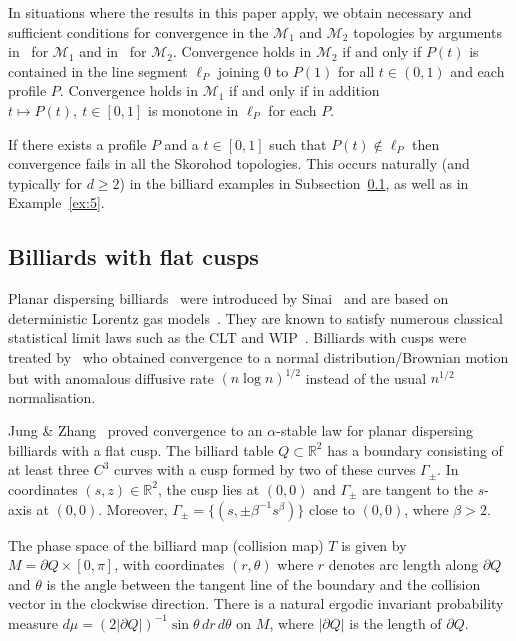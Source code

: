 \documentclass[12pt]{article}
\numberwithin{equation}{section}
\newcommand{\R}{{\mathbb R}}
\newcommand{\cM}{{\mathcal M}}
\begin{document}
\begin{rmk}
In situations where the results in this paper apply, we obtain necessary and sufficient conditions for convergence in the $\cM_1$ and $\cM_2$ topologies by arguments
in~\cite{MV20}
for $\cM_1$ and in~\cite{JMPVZ21} for $\cM_2$.
Convergence holds in $\cM_2$ if and only if 
$P(t)$ is contained in the line segment $\ell_P$  joining $0$ to $P(1)$ for all $t\in(0,1)$ and each profile $P$. 
Convergence holds in $\cM_1$ if and only if 
in addition $t\mapsto P(t),\ t\in[0,1]$ is monotone in $\ell_P$ for each $P$.

If there exists a profile $P$ and a $t\in[0,1]$ such that $P(t)\not\in \ell_P$ then convergence fails in all the Skorohod topologies. 
This occurs naturally (and typically for $d\ge2$) in the billiard examples in Subsection~\ref{sec:cusps}, as well as in Example~\ref{ex:5}.
\end{rmk}





\subsection{Billiards with flat cusps}
\label{sec:cusps}


Planar dispersing billiards~\cite{ChernovMarkarian} were introduced by Sinai~\cite{Sinai70} and are based on deterministic Lorentz gas models~\cite{Lorentz05}. They 
are known to satisfy numerous classical statistical limit laws 
such as the CLT  and WIP~\cite{BunimSinai81,BunimovichSinaiChernov91}. Billiards with cusps were treated by~\cite{BalintChernovDolgopyat11} who obtained convergence to a normal distribution/Brownian motion but with anomalous diffusive rate $(n\log n)^{1/2}$ instead of the usual $n^{1/2}$ normalisation.

Jung \& Zhang~\cite{JungZhang18} proved convergence to an $\alpha$-stable law for planar dispersing billiards with a flat cusp.
The billiard table $Q\subset\R^2$ has a boundary consisting of at least three $C^3$ curves
with a cusp formed by two of these curves $\Gamma_\pm$. In
coordinates $(s, z) \in\R^2$, the cusp lies at $(0, 0)$ and $\Gamma_\pm$ are tangent to the $s$-axis
at $(0, 0)$. Moreover, 
$\Gamma_\pm = \{(s, \pm\beta^{-1} s^\beta )\}$
close to $(0, 0)$, 
where $\beta > 2$. 

The phase space of the billiard map (collision map) $T$ is given by $M= \partial  Q \times[0, \pi ]$,
with coordinates $(r, \theta )$ where $r$ denotes arc length along $\partial  Q$ and $\theta$ is the angle between
the tangent line of the boundary and the collision vector in the clockwise direction. There
is a natural ergodic invariant probability measure $d\mu = (2|\partial Q|)^{-1} \sin \theta \,dr \,d\theta$ on $M$,
where $|\partial Q|$ is the length of $\partial Q$.
\end{document}
